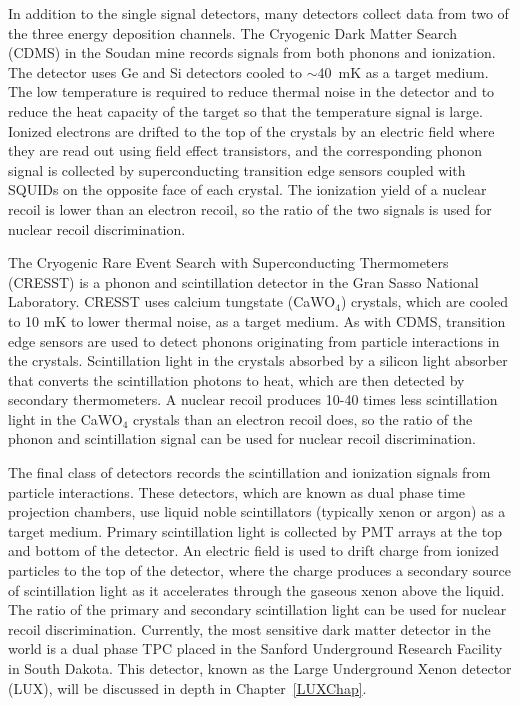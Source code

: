 In addition to the single signal detectors, many detectors collect data from two of the three energy deposition channels.  The Cryogenic Dark Matter Search (CDMS)  in the Soudan mine records signals from both phonons and ionization.  The detector uses Ge and Si detectors cooled to $\sim$40~mK as a target medium.  The low temperature is required to reduce thermal noise in the detector and to reduce the heat capacity of the target so that the temperature signal is large.  Ionized electrons are drifted to the top of the crystals by an electric field where they are read out using field effect transistors, and the corresponding phonon signal is collected by superconducting transition edge sensors coupled with SQUIDs on the opposite face of each crystal.  The ionization yield of a nuclear recoil is lower than an electron recoil, so the ratio of the two signals is used for nuclear recoil discrimination.

The Cryogenic Rare Event Search with Superconducting Thermometers (CRESST) is a phonon and scintillation detector in the Gran Sasso National Laboratory.  CRESST uses calcium tungstate (CaWO$_4$) crystals, which are cooled to 10 mK to lower thermal noise, as a target medium. As with CDMS, transition edge sensors are used to detect phonons originating from particle interactions in the crystals.  Scintillation light in the crystals absorbed by a silicon light absorber that converts the scintillation photons to heat, which are then detected by secondary thermometers.  A nuclear recoil produces 10-40 times less scintillation light in the CaWO$_4$ crystals than an electron recoil does, so the ratio of the phonon and scintillation signal can be used for nuclear recoil discrimination.

The final class of detectors records the scintillation and ionization signals from particle interactions.  These detectors, which are known as dual phase time projection chambers, use liquid noble scintillators (typically xenon or argon) as a target medium. Primary scintillation light is collected by PMT arrays at the top and bottom of the detector. An electric field is used to drift charge from ionized particles to the top of the detector, where the charge produces a secondary source of scintillation light as it accelerates through the gaseous xenon above the liquid.  The ratio of the primary and secondary scintillation light can be used for nuclear recoil discrimination.  Currently, the most sensitive dark matter detector in the world is a dual phase TPC placed in the Sanford Underground Research Facility in South Dakota.  This detector, known as the Large Underground Xenon detector (LUX), will be discussed in depth in Chapter~\ref{LUXChap}.
